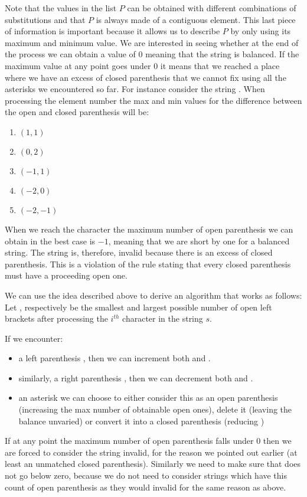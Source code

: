 Note that the values in the list $P$ can be obtained with different combinations of substitutions and that $P$ is always made of a contiguous element. This last piece of information is important because it allows us to describe $P$ by only using its maximum and minimum value. We are interested in seeing whether at the end of the process we can obtain a value of $0$ meaning that the string is balanced. If the maximum value at any point goes under $0$ it means that we reached a place where we have an excess of closed parenthesis that we cannot fix using all the asterisks we encountered so far. For instance consider the string . When processing the element number the max and min values for the difference between the open and closed parenthesis will be:
\begin{enumerate}
	\item $(1,1)$
	\item $(0,2)$
	\item $(-1,1)$
	\item $(-2,0)$ 
	\item $(-2,-1)$ 
\end{enumerate}
When we reach the  character the maximum number of open parenthesis we can obtain in the best case is $-1$, meaning that we are short by one for a balanced string. The string is, therefore, invalid because there is an excess of closed parenthesis. This is a violation of the rule stating that every closed parenthesis must have a proceeding open one.

We can use the idea described above to derive an algorithm  that works as follows:
Let ,  respectively be the smallest and largest possible number of open left brackets after processing the $i^{th}$ character in the string $s$.

If we encounter:
\begin{itemize}
	\item a left parenthesis \fbox{(}, then we can increment both  and .
	\item similarly, a right parenthesis \fbox{)}, then we can decrement both  and .
	\item an asterisk \fbox{*} we can choose to either consider this as an open parenthesis (increasing the max number of obtainable open ones), delete it (leaving the balance unvaried) or convert it into a closed parenthesis (reducing  )
\end{itemize}
If at any point the maximum number of open parenthesis falls under $0$ then we are forced to consider the string invalid, for the reason we pointed out earlier (at least an unmatched closed parenthesis). Similarly we need to make sure that  does not go below zero, because we do not need to consider strings which have this count of open parenthesis as they would invalid for the same reason as above.

